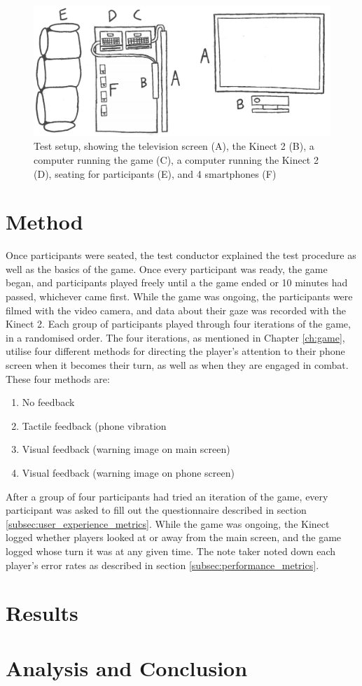 \begin{figure}[h!]
	\centering
	\includegraphics[width=\textwidth]{figures/test_setup.png}
	\caption{Test setup, showing the television screen (A), the Kinect 2 (B), a computer running the game (C), a computer running the Kinect 2 (D), seating for participants (E), and 4 smartphones (F)}\label{fig:test_setup}
\end{figure}

\section{Method}
Once participants were seated, the test conductor explained the test procedure as well as the basics of the game. Once every participant was ready, the game began, and participants played freely until a the game ended or 10 minutes had passed, whichever came first. While the game was ongoing, the participants were filmed with the video camera, and data about their gaze was recorded with the Kinect 2. Each group of participants played through four iterations of the game, in a randomised order. The four iterations, as mentioned in Chapter \ref{ch:game}, utilise four different methods for directing the player's attention to their phone screen when it becomes their turn, as well as when they are engaged in combat. These four methods are:

\begin{enumerate}[label=\Alph*)]
	\item No feedback
	\item Tactile feedback (phone vibration
	\item Visual feedback (warning image on main screen)
	\item Visual feedback (warning image on phone screen)
\end{enumerate}

After a group of four participants had tried an iteration of the game, every participant was asked to fill out the questionnaire described in section \ref{subsec:user_experience_metrics}. While the game was ongoing, the Kinect logged whether players looked at or away from the main screen, and the game logged whose turn it was at any given time. The note taker noted down each player's error rates as described in section \ref{subsec:performance_metrics}.

\section{Results}

\section{Analysis and Conclusion}